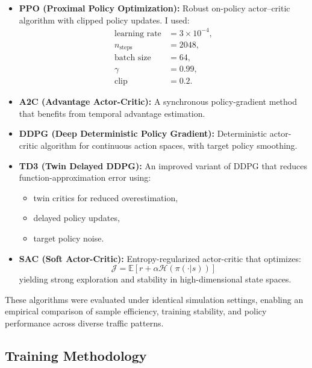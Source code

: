 \documentclass[10pt,twocolumn]{article}
\begin{document}
\begin{itemize}
    \item \textbf{PPO (Proximal Policy Optimization):} Robust on-policy actor--critic algorithm with clipped policy updates. I used:
    \[
        \begin{aligned}
        \text{learning rate} &= 3\times10^{-4}, \\
        n_{\text{steps}} &= 2048, \\
        \text{batch size} &= 64, \\
        \gamma &= 0.99, \\
        \text{clip} &= 0.2.
        \end{aligned}
    \]

    \item \textbf{A2C (Advantage Actor-Critic):} A synchronous policy-gradient method that benefits from temporal advantage estimation.
    \item \textbf{DDPG (Deep Deterministic Policy Gradient):} Deterministic actor-critic algorithm for continuous action spaces, with target policy smoothing.
    \item \textbf{TD3 (Twin Delayed DDPG):} An improved variant of DDPG that reduces function-approximation error using:
        \begin{itemize}
            \item twin critics for reduced overestimation,
            \item delayed policy updates,
            \item target policy noise.
        \end{itemize}
    \item \textbf{SAC (Soft Actor-Critic):} Entropy-regularized actor-critic that optimizes:
        \[
        \mathcal{J} = \mathbb{E}[r + \alpha \mathcal{H}(\pi(\cdot | s))]
        \]
        yielding strong exploration and stability in high-dimensional state spaces.
\end{itemize}

These algorithms were evaluated under identical simulation settings, enabling an empirical comparison of sample efficiency, training stability, and policy performance across diverse traffic patterns.

\subsection{Training Methodology}
\end{document}
